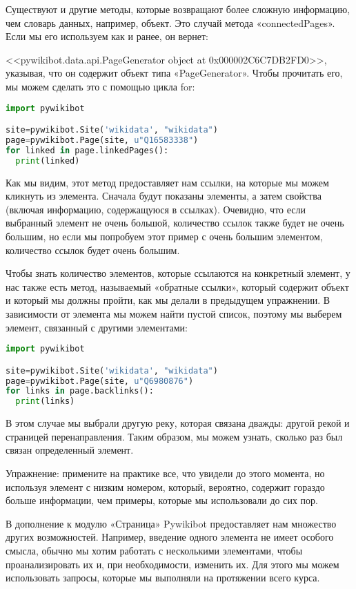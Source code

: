 Существуют и другие методы, которые возвращают более сложную информацию, чем словарь данных, например, объект. Это случай метода «connectedPages». Если мы его используем как и ранее, он вернет: 

<<pywikibot.data.api.PageGenerator object at 0x000002C6C7DB2FD0>>, 
указывая, что он содержит объект типа «PageGenerator». Чтобы прочитать его, мы можем сделать это с помощью цикла for:

\begin{lstlisting}[language=Python]
import pywikibot

site=pywikibot.Site('wikidata', "wikidata")
page=pywikibot.Page(site, u"Q16583338")
for linked in page.linkedPages():
  print(linked)
\end{lstlisting}

Как мы видим, этот метод предоставляет нам ссылки, на которые мы можем кликнуть из элемента. Сначала будут показаны элементы, а затем свойства (включая информацию, содержащуюся в ссылках). Очевидно, что если выбранный элемент не очень большой, количество ссылок также будет не очень большим, но если мы попробуем этот пример с очень большим элементом, количество ссылок будет очень большим.

Чтобы знать количество элементов, которые ссылаются на конкретный элемент, у нас также есть метод, называемый «обратные ссылки», который содержит объект и который мы должны пройти, как мы делали в предыдущем упражнении. В зависимости от элемента мы можем найти пустой список, поэтому мы выберем элемент, связанный с другими элементами:

\begin{lstlisting}[language=Python]
import pywikibot

site=pywikibot.Site('wikidata', "wikidata")
page=pywikibot.Page(site, u"Q6980876")
for links in page.backlinks():
  print(links)
\end{lstlisting}

В этом случае мы выбрали другую реку, которая связана дважды: другой рекой и страницей перенаправления. Таким образом, мы можем узнать, сколько раз был связан определенный элемент.

Упражнение: примените на практике все, что увидели до этого момента, но используя элемент с низким номером, который, вероятно, содержит гораздо больше информации, чем примеры, которые мы использовали до сих пор.

В дополнение к модулю «Страница» Pywikibot предоставляет нам множество других возможностей. Например, введение одного элемента не имеет особого смысла, обычно мы хотим работать с несколькими элементами, чтобы проанализировать их и, при необходимости, изменить их. Для этого мы можем использовать запросы, которые мы выполняли на протяжении всего курса.
